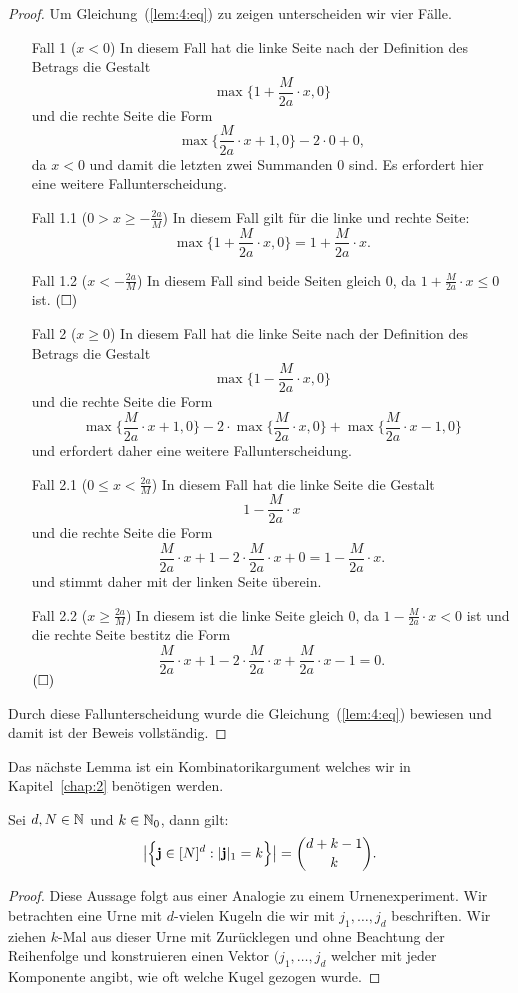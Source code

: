 \begin{proof}
Um Gleichung~(\ref{lem:4:eq}) zu zeigen unterscheiden wir vier Fälle.
  \begin{itemize}
  \item[Fall 1] ($x < 0$) In diesem Fall hat die linke Seite nach der Definition des Betrags die Gestalt $$\max\{1 + \frac{M}{2a} \cdot x, 0\}$$ und die rechte Seite die Form $$\max\{\frac{M}{2a} \cdot x + 1, 0\} - 2 \cdot 0 + 0,$$ da $x < 0$ und damit die letzten zwei Summanden 0 sind. Es erfordert hier eine weitere Fallunterscheidung.
 \item[Fall 1.1] ($0 > x \geq -\frac{2a}{M}$) In diesem Fall gilt für die linke und rechte Seite:
 $$\max\{1 + \frac{M}{2a} \cdot x, 0\} = 1 + \frac{M}{2a} \cdot x.$$
 \item[Fall 1.2] ($x < -\frac{2a}{M}$) In diesem Fall sind beide Seiten gleich 0, da $1 + \frac{M}{2a} \cdot x \leq 0$ ist. $\hfill(\square)$
  \item[Fall 2] ($x \geq 0$) In diesem Fall hat die linke Seite nach der Definition des Betrags die Gestalt $$\max\{1 - \frac{M}{2a} \cdot x, 0\}$$ und die rechte Seite die Form $$\max\{\frac{M}{2a} \cdot x + 1, 0\} - 2 \cdot \max\{\frac{M}{2a} \cdot x, 0\} + \max\{\frac{M}{2a} \cdot x - 1, 0\}$$ und erfordert daher eine weitere Fallunterscheidung.
 \item[Fall 2.1] ($0 \leq x < \frac{2a}{M}$) In diesem Fall hat die linke Seite die Gestalt $$1 - \frac{M}{2a} \cdot x$$ und die rechte Seite die Form $$\frac{M}{2a} \cdot x + 1 - 2 \cdot \frac{M}{2a} \cdot x + 0 = 1 - \frac{M}{2a} \cdot x.$$ und stimmt daher mit der linken Seite überein.
 \item[Fall 2.2] ($x \geq \frac{2a}{M}$) In diesem ist die linke Seite gleich 0, da $1 - \frac{M}{2a} \cdot x < 0$ ist und die rechte Seite bestitz die Form $$\frac{M}{2a} \cdot x + 1 - 2 \cdot \frac{M}{2a} \cdot x + \frac{M}{2a} \cdot x - 1 = 0.$$ $\hfill(\square)$
\end{itemize} 
Durch diese Fallunterscheidung wurde die Gleichung~(\ref{lem:4:eq}) bewiesen und damit ist der Beweis vollständig.
  \end{proof}
Das nächste Lemma ist ein Kombinatorikargument welches wir in Kapitel~\ref{chap:2} benötigen werden.
\begin{lem}
\label{lem:kombi}
Sei $d, N \in \mathbb{N}$ und $k \in \mathbb{N}_0$, dann gilt:
$$\big|\Bigl\{\mathbf{j} \in [N]^d : |\mathbf{j}|_1 = k \Bigr\}\big| = \binom{d + k - 1}{k}.$$
\end{lem}
\begin{proof}
Diese Aussage folgt aus einer Analogie zu einem Urnenexperiment. Wir betrachten eine Urne mit $d$-vielen Kugeln die wir mit $j_1,\dots,j_d$ beschriften. Wir ziehen $k$-Mal aus dieser Urne mit Zurücklegen und ohne Beachtung der Reihenfolge und konstruieren einen Vektor $(j_1,\dots,j_d$ welcher mit jeder Komponente angibt, wie oft welche Kugel gezogen wurde.
\end{proof}
